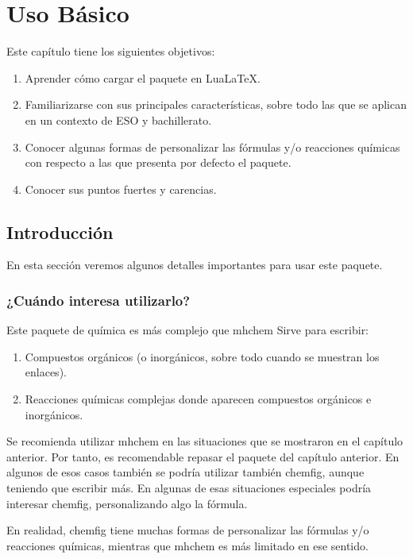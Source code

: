 %


\chapter{Uso Básico}
Este capítulo tiene los siguientes objetivos:
\begin{enumerate}
\item Aprender cómo cargar el paquete en Lua\LaTeX.
\item Familiarizarse con sus principales características, sobre todo las que se aplican
  en un contexto de ESO y bachillerato.
\item Conocer algunas formas de personalizar las fórmulas y/o reacciones químicas con
  respecto a las que presenta por defecto el paquete.
\item Conocer sus puntos fuertes y carencias.
\end{enumerate}

\section{Introducción}
En esta sección veremos algunos detalles importantes para usar este paquete.

\subsection{¿Cuándo interesa utilizarlo?}
Este paquete de química es más complejo que \textsf{mhchem}
Sirve para escribir:
\begin{enumerate}
\item Compuestos orgánicos (o inorgánicos, sobre todo cuando se muestran los enlaces).
\item Reacciones químicas complejas donde aparecen compuestos orgánicos e inorgánicos.
\end{enumerate}

Se recomienda utilizar \textsf{mhchem} en las situaciones que se mostraron en el
capítulo anterior. Por tanto, es recomendable repasar el paquete del capítulo anterior.
En algunos de esos casos también se podría utilizar también \textsf{chemfig}, aunque
teniendo que escribir más. En algunas de esas situaciones especiales podría interesar
\textsf{chemfig}, personalizando algo la fórmula.

En realidad, \textsf{chemfig} tiene muchas formas de personalizar las fórmulas y/o
reacciones químicas, mientras que \textsf{mhchem} es más limitado en ese sentido.

